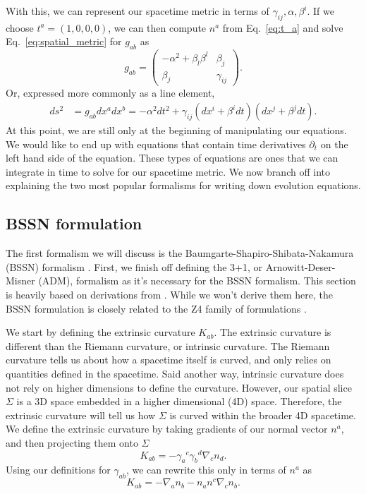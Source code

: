 \begin{bibunit}[unsrtnat]
With this, we can represent our spacetime metric in terms of
$\gamma_{ij},\alpha,\beta^i$. If we choose $t^a = (1,0,0,0)$, we can then
compute $n^a$ from Eq.~\ref{eq:t_a} and solve Eq.~\ref{eq:spatial_metric} for
$g_{ab}$ as
\begin{equation}
   g_{ab} = \left(
      \begin{matrix}
         -\alpha^2 + \beta_l\beta^l & \beta_j \\
         \beta_j & \gamma_{ij}
      \end{matrix}
   \right) .
\end{equation}
Or, expressed more commonly as a line element,
\begin{eqnarray}\label{eq:nr_spacetime_line_element}
  ds^2 &= g_{ab}dx^a dx^b =-\alpha^2 dt^2 + \gamma_{ij}
         \left(dx^i+\beta^i dt\right) \left(dx^j +\beta^j dt\right) .
\end{eqnarray}
At this point, we are still only at the beginning of manipulating our equations.
We would like to end up with equations that contain time derivatives
$\partial_t$ on the left hand side of the equation. These types of equations are
ones that we can integrate in time to solve for our spacetime metric. We now
branch off into explaining the two most popular formalisms for writing down
evolution equations.

\subsection{BSSN formulation}
The first formalism we will discuss is the Baumgarte-Shapiro-Shibata-Nakamura
(BSSN) formalism \cite{Shibata:1995we,Baumgarte:1998te}. First, we finish off
defining the 3+1, or Arnowitt-Deser-Misner \cite{Arnowitt:1962hi} (ADM),
formalism  as it's necessary for the BSSN formalism. This section is heavily
based on derivations from \cite{Baumgarte:2010ndz}. While we won't derive them
here, the BSSN formulation is closely related to the Z4 family of formulations
\cite{Bona:2003fj,Bernuzzi:2009ex,Hilditch:2012fp,Alic:2011gg}.

We start by defining the extrinsic curvature $K_{ab}$. The
extrinsic curvature is different than the Riemann curvature, or intrinsic
curvature. The Riemann curvature tells us about how a spacetime itself is
curved, and only relies on quantities defined in the spacetime. Said another
way, intrinsic curvature does not rely on higher dimensions to define the
curvature. However, our spatial slice $\Sigma$ is a 3D space embedded in a
higher dimensional (4D) space. Therefore, the extrinsic curvature will tell us
how $\Sigma$ is curved within the broader 4D spacetime. We define the extrinsic
curvature by taking gradients of our normal vector $n^a$, and then projecting
them onto $\Sigma$
\begin{equation}
   K_{ab} = -{\gamma_a}^c{\gamma_b}^d\nabla_c n_d .
\end{equation}
Using our definitions for $\gamma_{ab}$, we can rewrite this only in terms of
$n^a$ as
\begin{equation}
   K_{ab} = -\nabla_a n_b - n_a n^c\nabla_c n_b .
\end{equation}


\end{bibunit}
